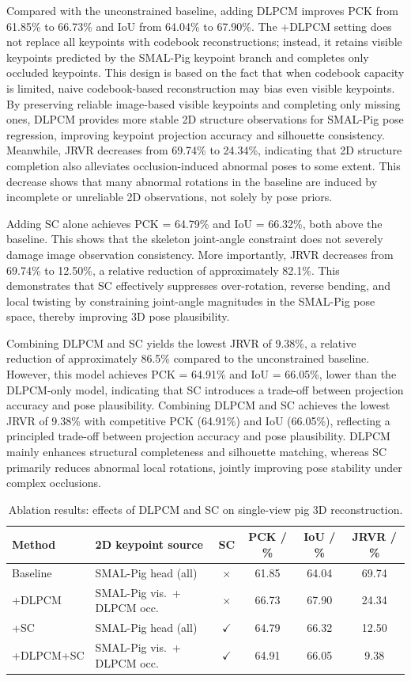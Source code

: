 \documentclass[computers,article,submit,pdftex,moreauthors]{Definitions/mdpi}
\begin{document}
Compared with the unconstrained baseline, adding DLPCM improves PCK from 61.85\% to 66.73\% and IoU from 64.04\% to 67.90\%. The +DLPCM setting does not replace all keypoints with codebook reconstructions; instead, it retains visible keypoints predicted by the SMAL-Pig keypoint branch and completes only occluded keypoints. This design is based on the fact that when codebook capacity is limited, naive codebook-based reconstruction may bias even visible keypoints. By preserving reliable image-based visible keypoints and completing only missing ones, DLPCM provides more stable 2D structure observations for SMAL-Pig pose regression, improving keypoint projection accuracy and silhouette consistency. Meanwhile, JRVR decreases from 69.74\% to 24.34\%, indicating that 2D structure completion also alleviates occlusion-induced abnormal poses to some extent. This decrease shows that many abnormal rotations in the baseline are induced by incomplete or unreliable 2D observations, not solely by pose priors.

Adding SC alone achieves PCK = 64.79\% and IoU = 66.32\%, both above the baseline. This shows that the skeleton joint-angle constraint does not severely damage image observation consistency. More importantly, JRVR decreases from 69.74\% to 12.50\%, a relative reduction of approximately 82.1\%. This demonstrates that SC effectively suppresses over-rotation, reverse bending, and local twisting by constraining joint-angle magnitudes in the SMAL-Pig pose space, thereby improving 3D pose plausibility.

Combining DLPCM and SC yields the lowest JRVR of 9.38\%, a relative reduction of approximately 86.5\% compared to the unconstrained baseline. However, this model achieves PCK = 64.91\% and IoU = 66.05\%, lower than the DLPCM-only model, indicating that SC introduces a trade-off between projection accuracy and pose plausibility. Combining DLPCM and SC achieves the lowest JRVR of 9.38\% with competitive PCK (64.91\%) and IoU (66.05\%), reflecting a principled trade-off between projection accuracy and pose plausibility. DLPCM mainly enhances structural completeness and silhouette matching, whereas SC primarily reduces abnormal local rotations, jointly improving pose stability under complex occlusions.

\begin{table}[H]
\caption{Ablation results: effects of DLPCM and SC on single-view pig 3D reconstruction.}
\label{tab:ablation}
\centering
\small
\begin{tabular}{llcccc}
\toprule
\textbf{Method} & \textbf{2D keypoint source} & \textbf{SC} & \textbf{PCK / \%} & \textbf{IoU / \%} & \textbf{JRVR / \%} \\
\midrule
Baseline & SMAL-Pig head (all) & $\times$ & 61.85 & 64.04 & 69.74 \\
+DLPCM & SMAL-Pig vis.\ + DLPCM occ. & $\times$ & 66.73 & 67.90 & 24.34 \\
+SC & SMAL-Pig head (all) & $\checkmark$ & 64.79 & 66.32 & 12.50 \\
+DLPCM+SC & SMAL-Pig vis.\ + DLPCM occ. & $\checkmark$ & 64.91 & 66.05 & 9.38 \\
\bottomrule
\end{tabular}
\end{table}
\end{document}
